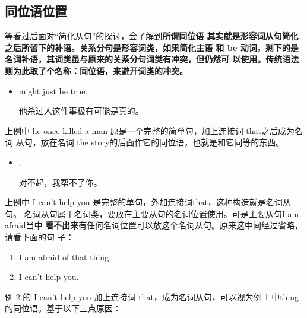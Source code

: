 \subsection{同位语位置}

等看过后面对“简化从句”的探讨，会了解到\textbf{所谓同位语
  其实就是形容词从句简化之后所留下的补语。关系分句是形容词类，如果简化主语
  和 be 动词，剩下的是名词补语，其词类虽与原来的关系分句词类有冲突，但仍然可
  以使用。传统语法则为此取了个名称：同位语，来避开词类的冲突。}
\begin{itemize}
\item {}  might just
  be true.

  他杀过人这件事极有可能是真的。
\end{itemize}
上例中 he once killed a man 原是一个完整的简单句，加上连接词 that之后成为名词
从句，放在名词 the story的后面作它的同位语，也就是和它同等的东西。

\begin{itemize}
\item {}   .

  对不起，我帮不了你。
\end{itemize}
上例中 I can't help you 是完整的单句，外加连接词that，这种构造就是名词从句。
名词从句属于名词类，要放在主要从句的名词位置使用。可是主要从句I am afraid当中
\textbf{看不出来}有任何名词位置可以放这个名词从句。原来这中间经过省略，请看下面的句
子：
\begin{enumerate}
\item I am afraid of that thing.
\item I can't help you.
\end{enumerate}
例 2 的 I can't help you 加上连接词 that，成为名词从句，可以视为例 1 中thing
的同位语。基于以下三点原因：

